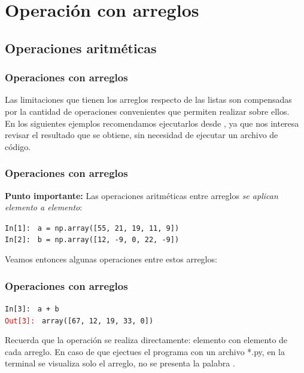 \section{Operación con arreglos}
\subsection{Operaciones aritméticas}
\begin{frame}
\frametitle{Operaciones con arreglos}
Las limitaciones que tienen los arreglos respecto de las listas son compensadas por la cantidad de operaciones convenientes que permiten realizar sobre ellos.
\\
\bigskip
En los siguientes ejemplos recomendamos ejecutarlos desde , ya que nos interesa revisar el resultado que se obtiene, sin necesidad de ejecutar un archivo de código.
\end{frame}
\begin{frame}[fragile]
\frametitle{Operaciones con arreglos}    
\textbf{Punto importante:} Las operaciones aritméticas entre arreglos \emph{se aplican elemento a elemento}:
\begin{tcolorbox}[colback=aquamarine!30!white, colbacktitle=kellygreen, coltitle=white, fonttitle=\small, title=Definimos los arreglos]
\fontsize{10}{10}\selectfont
\textcolor{ao}{\texttt{In[1]: }} \texttt{a = np.array([55, 21, 19, 11,  9])} \\
\bigskip
\pause
\textcolor{ao}{\texttt{In[2]: }} \texttt{b = np.array([12, -9,  0, 22, -9])}
\end{tcolorbox}
\pause
Veamos entonces algunas operaciones entre estos arreglos:
\end{frame}
\begin{frame}[fragile]
\frametitle{Operaciones con arreglos}
\begin{tcolorbox}[colback=aquamarine!30!white, colbacktitle=kellygreen, coltitle=white, fonttitle=\small, title=Suma de dos arreglos]
\fontsize{10}{10}\selectfont
\textcolor{ao}{\texttt{In[3]: }} \texttt{a + b} \\
\medskip
\pause
\textcolor{red}{\texttt{Out[3]: }} \texttt{array([67, 12, 19, 33,  0])}
\end{tcolorbox}
Recuerda que la operación se realiza directamente: elemento con elemento de cada arreglo. En caso de que ejectues el programa con un archivo *.py, en la terminal se visualiza solo el arreglo, no se presenta la palabra .
\end{frame}
